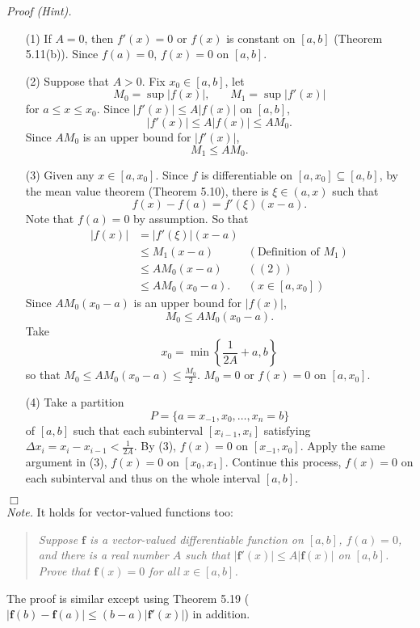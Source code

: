 \documentclass{article}
\begin{document}
\emph{Proof (Hint).}
\begin{enumerate}
\item[(1)]
If $A = 0$, then $f'(x) = 0$ or $f(x)$ is constant on $[a,b]$ (Theorem 5.11(b)).
Since $f(a) = 0$, $f(x) = 0$ on $[a,b]$.

\item[(2)]
Suppose that $A > 0$.
Fix $x_0 \in [a,b]$, let
\[
  M_0 = \sup{|f(x)|}, \:\:\:\:\:\:\:\: M_1 = \sup{|f'(x)|}
\]
for $a \leq x \leq x_0$.
Since $|f'(x)| \leq A|f(x)|$ on $[a,b]$,
\[
  |f'(x)| \leq A|f(x)| \leq A M_0.
\]
Since $A M_0$ is an upper bound for $|f'(x)|$,
\[
  M_1 \leq A M_0.
\]

\item[(3)]
Given any $x \in [a,x_0]$.
Since $f$ is differentiable on $[a,x_0] \subseteq [a,b]$,
by the mean value theorem (Theorem 5.10), there is $\xi \in (a,x)$
such that
\[
  f(x) - f(a) = f'(\xi)(x - a).
\]
Note that $f(a) = 0$ by assumption.
So that
\begin{align*}
  |f(x)|
  &= |f'(\xi)|(x - a) \\
  &\leq M_1 (x - a)
    &(\text{Definition of $M_1$}) \\
  &\leq A M_0 (x - a)
    &((2)) \\
  &\leq A M_0 (x_0 - a).
    &(x \in [a,x_0])
\end{align*}
Since $A M_0 (x_0 - a)$ is an upper bound for $|f(x)|$,
\[
  M_0 \leq A M_0 (x_0 - a).
\]
Take
\[
  x_0 = \min \left\{ \frac{1}{2A} + a, b \right\}
\]
so that $M_0 \leq A M_0 (x_0 - a) \leq \frac{M_0}{2}$.
$M_0 = 0$ or $f(x) = 0$ on $[a,x_0]$.

\item[(4)]
Take a partition
\[
  P = \{ a = x_{-1}, x_0, \ldots, x_n = b \}
\]
of $[a,b]$ such that each subinterval $[x_{i-1},x_i]$ satisfying
$\Delta x_i = x_i - x_{i-1} < \frac{1}{2A}$.
By (3), $f(x) = 0$ on $[x_{-1},x_0]$.
Apply the same argument in (3), $f(x) = 0$ on $[x_0,x_1]$.
Continue this process, $f(x) = 0$ on each subinterval and thus on the whole interval $[a,b]$.
\end{enumerate}
$\Box$ \\



\emph{Note.}
It holds for vector-valued functions too:
\begin{quote}
\emph{Suppose $\mathbf{f}$ is a vector-valued differentiable function on $[a,b]$, $f(a) = 0$,
and there is a real number $A$ such that $|\mathbf{f}'(x)| \leq A|\mathbf{f}(x)|$ on $[a,b]$.
Prove that $\mathbf{f}(x)=0$ for all $x \in [a,b]$.}
\end{quote}
The proof is similar except using Theorem 5.19
($|\mathbf{f}(b) - \mathbf{f}(a)| \leq (b-a)|\mathbf{f}'(x)|$)
in addition. \\\\
\end{document}
